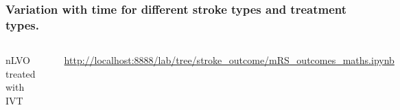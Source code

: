 \documentclass[xcolor={usenames,dvipsnames}]{beamer}
\newcommand{\smallurl}[1]{\textcolor{blue}{\fontsize{4pt}{4.8pt}\selectfont \url{#1}}}
\begin{document}


\begin{frame}[noframenumbering]
\frametitle{Variation with time for different stroke types and treatment types.}

\begin{columns}
    \footnotesize
    nLVO treated with IVT 
    \begin{center} 
    \includegraphics[width=\textwidth]{./images/probs_with_time_nlvo_ivt}
    \end{center} 
    \vspace{1em}
    \smallurl{http://localhost:8888/lab/tree/stroke_outcome/mRS_outcomes_maths.ipynb}


\end{columns}
\end{frame}
\end{document}
